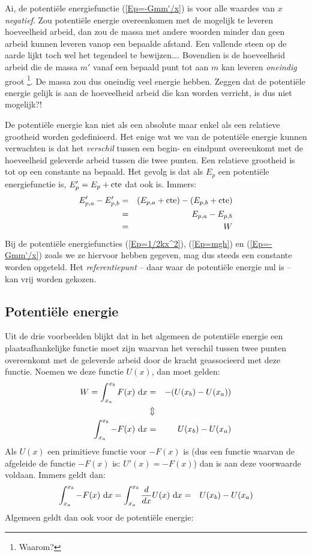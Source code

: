 Ai, de potenti\"ele energiefunctie (\ref{Ep=-Gmm'/x}) is voor alle waardes van $x$
\textit{negatief}. Zou potenti\"ele energie overeenkomen met de mogelijk te leveren hoeveelheid  arbeid, dan zou de massa met andere woorden minder dan geen arbeid kunnen leveren vanop een
bepaalde afstand. Een vallende steen op de aarde lijkt toch wel het tegendeel te bewijzen\ldots. Bovendien is de hoeveelheid arbeid die de massa $m'$ vanaf een bepaald punt tot aan $m$ kan leveren \textit{oneindig} groot \footnote{Waarom?}. De massa zou dus oneindig veel energie hebben. Zeggen dat de potenti\"ele energie gelijk is aan de hoeveelheid arbeid die kan worden verricht, is dus niet mogelijk?!

De potenti\"ele energie kan niet als een absolute maar enkel als een relatieve grootheid worden gedefinieerd. Het enige wat we van de potenti\"ele ener\-gie kunnen verwachten is dat het
\textit{verschil} tussen een begin- en eindpunt overeenkomt met de hoeveelheid geleverde arbeid tussen die twee punten.
Een relatieve grootheid is tot op een constante na bepaald. Het gevolg is dat als $E_p$ een potenti\"ele energiefunctie is, $E_p'=E_p+\rm cte$ dat ook is. Immers:
\begin{eqnarray*}
E_{p,a}'-E_{p,b}'&=&(E_{p,a}+{\rm cte})-(E_{p,b}+{\rm cte})\\
&=&E_{p,a}-E_{p,b}\\
&=&W
\end{eqnarray*}
Bij de potenti\"ele energiefuncties (\ref{Ep=1/2kx^2}), (\ref{Ep=mgh}) en (\ref{Ep=-Gmm'/x}) zoals we ze hiervoor hebben gegeven, mag dus steeds een constante worden opgeteld. Het
\textit{re\-fe\-ren\-tiepunt} -- daar waar de potenti\"ele energie nul is -- kan vrij worden gekozen.

\subsection{Potenti\"ele energie}

Uit de drie voorbeelden blijkt dat in het algemeen de potenti\"ele
energie een plaatsafhankelijke functie moet zijn waarvan het
verschil tussen twee punten overeenkomt met de geleverde arbeid door
de kracht geassocieerd met deze functie. Noemen we deze functie
$U(x)$, dan moet gelden:
\begin{eqnarray*}
  W=\int_{x_a}^{x_b}F(x)~{\rm d}x &=&-(U(x_b)-U(x_a))\\
  &\Updownarrow&\\
  \int_{x_a}^{x_b}-F(x)~{\rm d}x &=&U(x_b)-U(x_a)\\
\end{eqnarray*}
Als $U(x)$ een primitieve functie voor $-F(x)$ is (dus een functie
waarvan de afgeleide de functie $-F(x)$ is: $U'(x)=-F(x)$) dan is
aan deze voorwaarde voldaan. Immers geldt dan:
\begin{eqnarray*}
\int_{x_a}^{x_b}-F(x)~{\rm d}x=\int_{x_a}^{x_b}\frac{d}{dx}U(x)~{\rm d}x&=&U(x_b)-U(x_a)\\
\end{eqnarray*}
Algemeen geldt dan ook voor de potenti\"ele energie:

